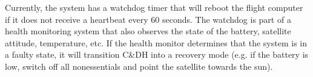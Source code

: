 
Currently, the system has a watchdog timer that will reboot the flight computer
if it does not receive a heartbeat every 60 seconds.  The watchdog is part of a
health monitoring system that also observes the state of the battery, satellite
attitude, temperature, etc. If the health monitor determines that the system is
in a faulty state, it will transition C\&DH into a recovery mode (e.g. if the
battery is low, switch off all nonessentials and point the satellite towards the
sun).


